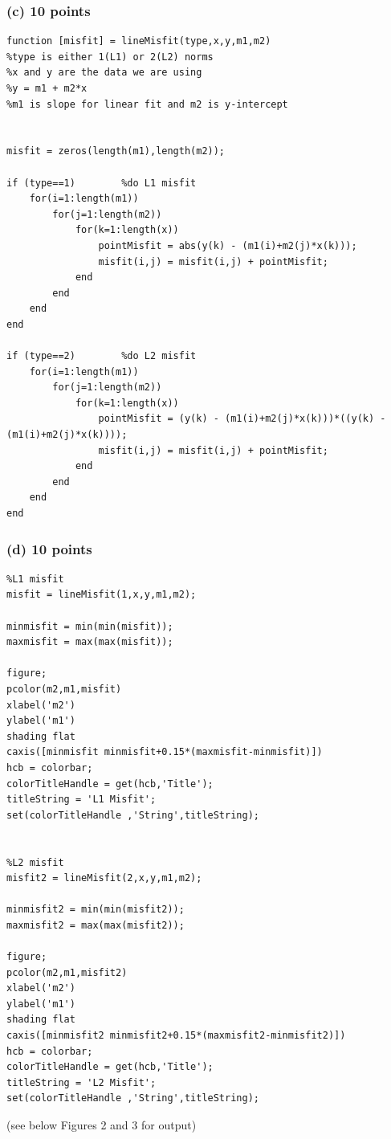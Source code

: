 \documentclass[11pt]{article}
\begin{document}
\subsubsection*{(c) 10 points}
\begin{verbatim}
function [misfit] = lineMisfit(type,x,y,m1,m2)
%type is either 1(L1) or 2(L2) norms
%x and y are the data we are using
%y = m1 + m2*x
%m1 is slope for linear fit and m2 is y-intercept


misfit = zeros(length(m1),length(m2));

if (type==1)        %do L1 misfit
    for(i=1:length(m1))
        for(j=1:length(m2))
            for(k=1:length(x))
                pointMisfit = abs(y(k) - (m1(i)+m2(j)*x(k)));
                misfit(i,j) = misfit(i,j) + pointMisfit;
            end
        end
    end
end

if (type==2)        %do L2 misfit
    for(i=1:length(m1))
        for(j=1:length(m2))
            for(k=1:length(x))
                pointMisfit = (y(k) - (m1(i)+m2(j)*x(k)))*((y(k) - (m1(i)+m2(j)*x(k))));
                misfit(i,j) = misfit(i,j) + pointMisfit;
            end
        end
    end
end
\end{verbatim}

\subsubsection*{(d) 10 points}
\begin{verbatim}
%L1 misfit
misfit = lineMisfit(1,x,y,m1,m2);

minmisfit = min(min(misfit));
maxmisfit = max(max(misfit));

figure;
pcolor(m2,m1,misfit)
xlabel('m2')
ylabel('m1')
shading flat
caxis([minmisfit minmisfit+0.15*(maxmisfit-minmisfit)])
hcb = colorbar;
colorTitleHandle = get(hcb,'Title');
titleString = 'L1 Misfit';
set(colorTitleHandle ,'String',titleString);


%L2 misfit
misfit2 = lineMisfit(2,x,y,m1,m2);

minmisfit2 = min(min(misfit2));
maxmisfit2 = max(max(misfit2));

figure;
pcolor(m2,m1,misfit2)
xlabel('m2')
ylabel('m1')
shading flat
caxis([minmisfit2 minmisfit2+0.15*(maxmisfit2-minmisfit2)])
hcb = colorbar;
colorTitleHandle = get(hcb,'Title');
titleString = 'L2 Misfit';
set(colorTitleHandle ,'String',titleString);
\end{verbatim}

(see below Figures 2 and 3 for output)
\end{document}
